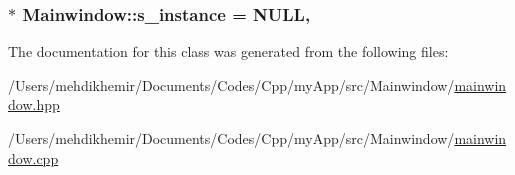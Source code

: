 \subsubsection[{s\+\_\+instance}]{ $\ast$ Mainwindow\+::s\+\_\+instance = N\+U\+L\+L\hspace{0.3cm}{\ttfamily [static]}, {\ttfamily [private]}}\label{class_mainwindow_a47858f9db0a0c89d7df36cb56925118d}


The documentation for this class was generated from the following files\+:\begin{DoxyCompactItemize}
\item 
/\+Users/mehdikhemir/\+Documents/\+Codes/\+Cpp/my\+App/src/\+Mainwindow/\hyperlink{mainwindow_8hpp}{mainwindow.\+hpp}\item 
/\+Users/mehdikhemir/\+Documents/\+Codes/\+Cpp/my\+App/src/\+Mainwindow/\hyperlink{mainwindow_8cpp}{mainwindow.\+cpp}\end{DoxyCompactItemize}
